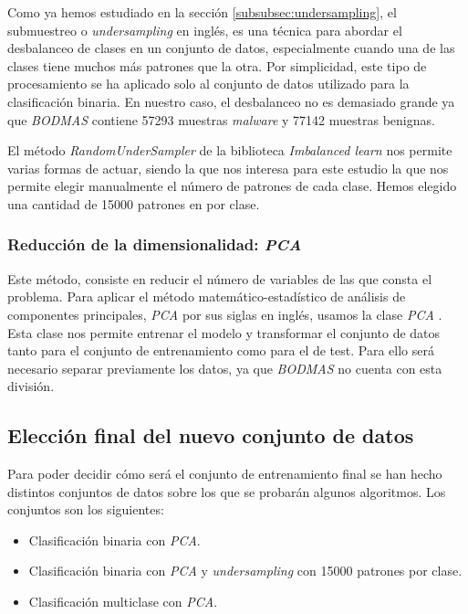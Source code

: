 Como ya hemos estudiado en la sección \ref{subsubsec:undersampling}, el submuestreo o \textit{undersampling} en inglés, es una técnica para abordar el desbalanceo de clases en un conjunto de datos, especialmente cuando una de las clases tiene muchos más patrones que la otra. Por simplicidad, este tipo de procesamiento se ha aplicado solo al conjunto de datos utilizado para la clasificación binaria. En nuestro caso, el desbalanceo no es demasiado grande ya que \textit{BODMAS} contiene 57293 muestras \textit{malware} y 77142 muestras benignas.

\vspace{1em}

El método \textit{RandomUnderSampler} \cite{randundersampler} de la biblioteca \textit{Imbalanced learn} nos permite varias formas de actuar, siendo la que nos interesa para este estudio la que nos permite elegir manualmente el número de patrones de cada clase. Hemos elegido una cantidad de 15000 patrones en por clase.

\subsubsection{Reducción de la dimensionalidad: \textit{PCA}}
\label{subsubsec:num_caract}

Este método, consiste en reducir el número de variables de las que consta el problema. Para aplicar el método matemático-estadístico de análisis de componentes principales, \textit{PCA} por sus siglas en inglés, usamos la clase \textit{PCA} \cite{sklearn_pca}. Esta clase nos permite entrenar el modelo y transformar el conjunto de datos tanto para el conjunto de entrenamiento como para el de test. Para ello será necesario separar previamente los datos, ya que \textit{BODMAS} no cuenta con esta división.

\subsection{Elección final del nuevo conjunto de datos}
\label{subsec:eleccion_dataset}

Para poder decidir cómo será el conjunto de entrenamiento final se han hecho distintos conjuntos de datos sobre los que se probarán algunos algoritmos. Los conjuntos son los siguientes:

\begin{itemize}
	\item Clasificación binaria con \textit{PCA}.
	\item Clasificación binaria con \textit{PCA} y \textit{undersampling} con 15000 patrones por clase.
	\item Clasificación multiclase con \textit{PCA}.
\end{itemize}

